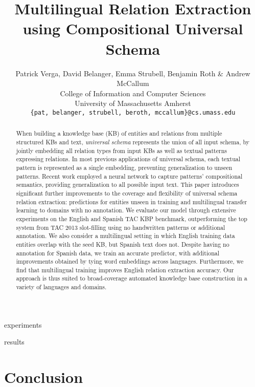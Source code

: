 \documentclass{article} %
\title{Multilingual Relation Extraction using Compositional Universal Schema}
\author{Patrick Verga, David Belanger, Emma Strubell, Benjamin Roth \& Andrew McCallum \\
College of Information and Computer Sciences\\
University of Massachusetts Amherst\\
\texttt{\{pat, belanger, strubell, beroth, mccallum\}@cs.umass.edu} \\
}
\begin{document}
\maketitle

\begin{abstract}
When building a knowledge base (KB) of entities and relations from multiple structured KBs and text, \emph{universal schema} represents the union of all input schema, by jointly embedding all relation types from input KBs as well as textual patterns expressing relations.  
In most previous applications of universal schema, each textual pattern is represented as a single embedding, preventing generalization to unseen patterns. 
Recent work employed a neural network to capture patterns' compositional semantics, providing generalization to all possible input text. 
This paper introduces significant further improvements to the coverage and flexibility of universal schema relation extraction: predictions for entities unseen in training and multilingual transfer learning to domains with no annotation. 
We evaluate our model through extensive experiments on the English and Spanish TAC KBP benchmark, outperforming the top system from TAC 2013 slot-filling using no handwritten patterns or additional annotation. 
We also consider a multilingual setting in which English training data entities overlap with the seed KB, but Spanish text does not. 
Despite having no annotation for Spanish data, we train an accurate predictor, with additional improvements obtained by tying word embeddings across languages. 
Furthermore, we find that multilingual training improves English relation extraction accuracy. 
Our approach is thus suited to broad-coverage automated knowledge base construction in a variety of languages and domains.
\end{abstract}





%
%



 {experiments}

 {results}


\section{Conclusion}
\end{document}
